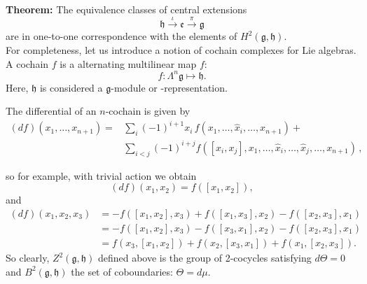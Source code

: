 \documentclass[submission, PhysLectNotes]{SciPost}
\begin{document}
{\bf Theorem:} The equivalence classes of central extensions
\begin{equation}
	\mathfrak{h}\overset{\iota}{\rightarrow}\mathfrak{e}\overset{\pi}{\rightarrow}\mathfrak{g}
\end{equation}
are in one-to-one correspondence with the elements of $H^2(\mathfrak{g},\mathfrak{h})$.\\

For completeness, let us introduce a notion of cochain complexes for Lie algebras. A cochain $f$ is a alternating multilinear map $f$:
\begin{equation}
	f:\Lambda^n \mathfrak{g} \mapsto \mathfrak{h}.
\end{equation}
Here, $\mathfrak{h}$ is considered a $\mathfrak{g}$-module or -representation.

The differential of an $n$-cochain is given by
\begin{equation}
\begin{aligned}
	(d f)\left(x_1, \ldots, x_{n+1}\right) =
	&\sum_i     (-1)^{i+1}x_i\, f\left(x_1, \ldots, \hat x_i, \ldots, x_{n+1}\right) + \\
	&\sum_{i<j} (-1)^{i+j}      f\left(\left[x_i, x_j\right], x_1, \ldots, \hat x_i, \ldots, \hat x_j, \ldots, x_{n+1}\right)\, ,
\end{aligned}
\end{equation}

so for example, with trivial action we obtain
\begin{equation}
	(df)(x_1,x_2) = f([x_1,x_2]),
\end{equation}
and
\begin{equation}
\begin{aligned}
	(df)(x_1,x_2,x_3) &= -f([x_1,x_2],x_3) + f([x_1,x_3],x_2) - f([x_2,x_3],x_1)\\
	&= -f([x_1,x_2],x_3) - f([x_3,x_1],x_2) - f([x_2,x_3],x_1)\\
	&= f(x_3,[x_1,x_2]) + f(x_2,[x_3,x_1]) + f(x_1,[x_2,x_3]).
\end{aligned}
\end{equation}
So clearly, $Z^2(\mathfrak{g},\mathfrak{h})$ defined above is the group of 2-cocycles satisfying $d\Theta=0$ and $B^2(\mathfrak{g},\mathfrak{h})$ the set of coboundaries: $\Theta = d\mu$.


\nolinenumbers
\end{document}
